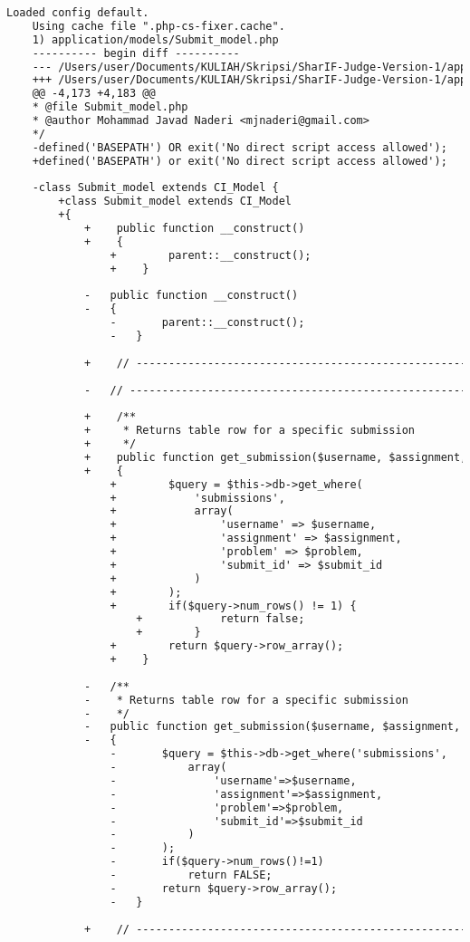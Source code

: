 \begin{lstlisting}[language=diff, caption=Perubahan pada kode Submit\_model.php]
	Loaded config default.
	Using cache file ".php-cs-fixer.cache".
	1) application/models/Submit_model.php
	---------- begin diff ----------
	--- /Users/user/Documents/KULIAH/Skripsi/SharIF-Judge-Version-1/application/models/Submit_model.php
	+++ /Users/user/Documents/KULIAH/Skripsi/SharIF-Judge-Version-1/application/models/Submit_model.php
	@@ -4,173 +4,183 @@
	* @file Submit_model.php
	* @author Mohammad Javad Naderi <mjnaderi@gmail.com>
	*/
	-defined('BASEPATH') OR exit('No direct script access allowed');
	+defined('BASEPATH') or exit('No direct script access allowed');
	
	-class Submit_model extends CI_Model {
		+class Submit_model extends CI_Model
		+{
			+    public function __construct()
			+    {
				+        parent::__construct();
				+    }
			
			-	public function __construct()
			-	{
				-		parent::__construct();
				-	}
			
			+    // ------------------------------------------------------------------------
			
			-	// ------------------------------------------------------------------------
			
			+    /**
			+     * Returns table row for a specific submission
			+     */
			+    public function get_submission($username, $assignment, $problem, $submit_id)
			+    {
				+        $query = $this->db->get_where(
				+            'submissions',
				+            array(
				+                'username' => $username,
				+                'assignment' => $assignment,
				+                'problem' => $problem,
				+                'submit_id' => $submit_id
				+            )
				+        );
				+        if($query->num_rows() != 1) {
					+            return false;
					+        }
				+        return $query->row_array();
				+    }
			
			-	/**
			-	 * Returns table row for a specific submission
			-	 */
			-	public function get_submission($username, $assignment, $problem, $submit_id)
			-	{
				-		$query = $this->db->get_where('submissions',
				-			array(
				-				'username'=>$username,
				-				'assignment'=>$assignment,
				-				'problem'=>$problem,
				-				'submit_id'=>$submit_id
				-			)
				-		);
				-		if($query->num_rows()!=1)
				-			return FALSE;
				-		return $query->row_array();
				-	}
			
			+    // ------------------------------------------------------------------------
			

\end{lstlisting}
